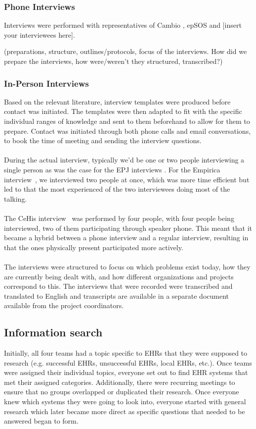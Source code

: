 \documentclass[14pt]{article}
\begin{document}
\subsubsection{Phone Interviews}

Interviews were performed with representatives of Cambio \cite{Cambio}, epSOS \cite{epSOS} and [insert your interviewees here].

(preparations, structure, outlines/protocols, focus of the interviews.
How did we prepare the interviews, how were/weren't they structured, transcribed?)

\subsubsection{In-Person Interviews}

Based on the relevant literature, interview templates were produced before contact was initiated. The templates were then adapted to fit with the specific individual ranges of knowledge and sent to them beforehand to allow for them to prepare. Contact was initiated through both phone calls and email conversations, to book the time of meeting and sending the interview questions.
\\\\
During the actual interview, typically we'd be one or two people interviewing a single person as was the case for the EPJ interviews \cite{EPJ1} \cite{EPJ2}. For the Empirica interview~\cite{Empirica}, we interviewed two people at once, which was more time efficient but led to that the most experienced of the two interviewees doing most of the talking.
\\\\
The CeHis interview~\cite{CeHis} was performed by four people, with four people being interviewed, two of them participating through speaker phone. This meant that it became a hybrid between a phone interview and a regular interview, resulting in that the ones physically present participated more actively.
\\\\
The interviews were structured to focus on which problems exist today, how they are currently being dealt with, and how different organizations and projects correspond to this. The interviews that were recorded were transcribed and translated to English and transcripts are available in a separate document available from the project coordinators.

\subsection{Information search}
Initially, all four teams had a topic specific to \glspl{EHR} that they were supposed to research (e.g. successful \glspl{EHR}, unsuccessful \glspl{EHR}, local \glspl{EHR}, etc.). Once teams were assigned their individual topics, everyone set out to find \gls{EHR} systems that met their assigned categories. Additionally, there were recurring meetings to ensure that no groups overlapped or duplicated their research. Once everyone knew which systems they were going to look into, everyone started with general research which later became more direct as specific questions that needed to be answered began to form.
\end{document}
